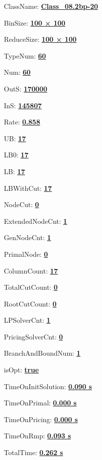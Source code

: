 \documentclass[11pt]{article}
\begin{document}
\pagestyle{empty}


ClassName: \underline{\textbf{Class_08.2bp-20}}
\par
BinSize: \underline{\textbf{100 × 100}}
\par
ReduceSize: \underline{\textbf{100 × 100}}
\par
TypeNum: \underline{\textbf{60}}
\par
Num: \underline{\textbf{60}}
\par
OutS: \underline{\textbf{170000}}
\par
InS: \underline{\textbf{145807}}
\par
Rate: \underline{\textbf{0.858}}
\par
UB: \underline{\textbf{17}}
\par
LB0: \underline{\textbf{17}}
\par
LB: \underline{\textbf{17}}
\par
LBWithCut: \underline{\textbf{17}}
\par
NodeCut: \underline{\textbf{0}}
\par
ExtendedNodeCnt: \underline{\textbf{1}}
\par
GenNodeCnt: \underline{\textbf{1}}
\par
PrimalNode: \underline{\textbf{0}}
\par
ColumnCount: \underline{\textbf{17}}
\par
TotalCutCount: \underline{\textbf{0}}
\par
RootCutCount: \underline{\textbf{0}}
\par
LPSolverCnt: \underline{\textbf{1}}
\par
PricingSolverCnt: \underline{\textbf{0}}
\par
BranchAndBoundNum: \underline{\textbf{1}}
\par
isOpt: \underline{\textbf{true}}
\par
TimeOnInitSolution: \underline{\textbf{0.090 s}}
\par
TimeOnPrimal: \underline{\textbf{0.000 s}}
\par
TimeOnPricing: \underline{\textbf{0.000 s}}
\par
TimeOnRmp: \underline{\textbf{0.093 s}}
\par
TotalTime: \underline{\textbf{0.262 s}}
\par
\newpage


\end{document}
